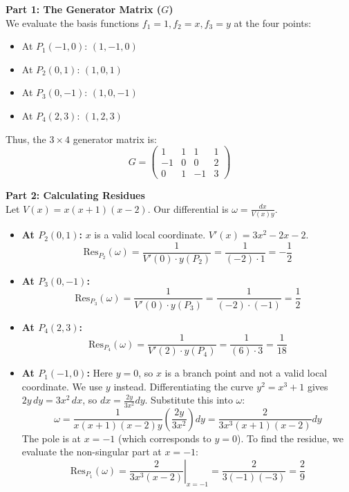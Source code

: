 \documentclass[11pt, a4paper, twoside]{article}
\begin{document}
		\textbf{Part 1: The Generator Matrix ($G$)}\\
		We evaluate the basis functions $f_1 = 1, f_2 = x, f_3 = y$ at the four points:
		\begin{itemize}
			\item At $P_1(-1,0)$: $(1, -1, 0)$
			\item At $P_2(0,1)$: $(1, 0, 1)$
			\item At $P_3(0,-1)$: $(1, 0, -1)$
			\item At $P_4(2,3)$: $(1, 2, 3)$
		\end{itemize}
		Thus, the $3 \times 4$ generator matrix is:
		$$ 
		G = \begin{pmatrix}
			1 & 1 & 1 & 1 \\
			-1 & 0 & 0 & 2 \\
			0 & 1 & -1 & 3
		\end{pmatrix}
		$$
		
		\vspace{1em}
		\textbf{Part 2: Calculating Residues}\\
		Let $V(x) = x(x+1)(x-2)$. Our differential is $\omega = \frac{dx}{V(x)y}$.
		\begin{itemize}
			\item \textbf{At $P_2(0,1)$:} $x$ is a valid local coordinate. $V'(x) = 3x^2 - 2x - 2$.
			$$ \text{Res}_{P_2}(\omega) = \frac{1}{V'(0) \cdot y(P_2)} = \frac{1}{(-2) \cdot 1} = -\frac{1}{2} $$
			\item \textbf{At $P_3(0,-1)$:} 
			$$ \text{Res}_{P_3}(\omega) = \frac{1}{V'(0) \cdot y(P_3)} = \frac{1}{(-2) \cdot (-1)} = \frac{1}{2} $$
			\item \textbf{At $P_4(2,3)$:} 
			$$ \text{Res}_{P_4}(\omega) = \frac{1}{V'(2) \cdot y(P_4)} = \frac{1}{(6) \cdot 3} = \frac{1}{18} $$
			\item \textbf{At $P_1(-1,0)$:} Here $y=0$, so $x$ is a branch point and not a valid local coordinate. We use $y$ instead. Differentiating the curve $y^2 = x^3 + 1$ gives $2y \,dy = 3x^2 \,dx$, so $dx = \frac{2y}{3x^2} dy$. 
			Substitute this into $\omega$:
			$$ \omega = \frac{1}{x(x+1)(x-2)y} \left(\frac{2y}{3x^2}\right) dy = \frac{2}{3x^3(x+1)(x-2)} dy $$
			The pole is at $x=-1$ (which corresponds to $y=0$). To find the residue, we evaluate the non-singular part at $x=-1$:
			$$ \text{Res}_{P_1}(\omega) = \left. \frac{2}{3x^3(x-2)} \right|_{x=-1} = \frac{2}{3(-1)(-3)} = \frac{2}{9} $$
		\end{itemize}
		
\end{document}
